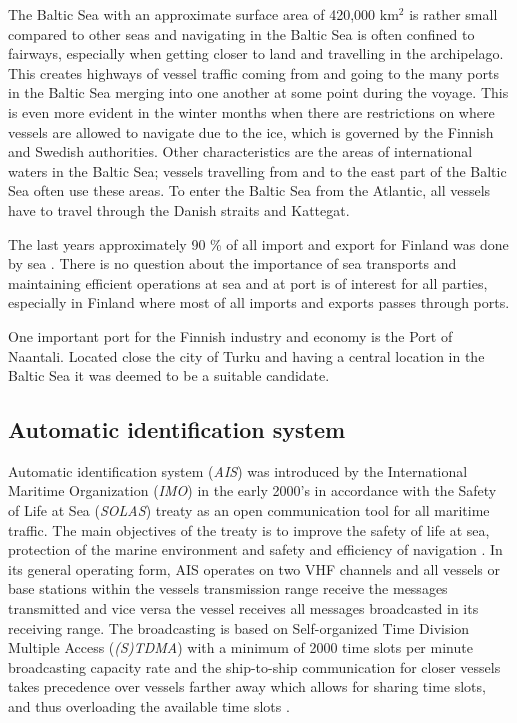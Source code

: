 \documentclass[../main.tex]{subfiles}
\begin{document}
The Baltic Sea with an approximate surface area of 420,000 km$^2$ is rather small compared to other seas and navigating in the Baltic Sea is often confined to fairways, especially when getting closer to land and travelling in the archipelago. This creates highways of vessel traffic coming from and going to the many ports in the Baltic Sea merging into one another at some point during the voyage. This is even more evident in the winter months when there are restrictions on where vessels are allowed to navigate due to the ice, which is governed by the Finnish and Swedish authorities. Other characteristics are the areas of international waters in the Baltic Sea; vessels travelling from and to the east part of the Baltic Sea often use these areas. To enter the Baltic Sea from the Atlantic, all vessels have to travel through the Danish straits and Kattegat.

The last years approximately 90 \% of all import and export for Finland was done by sea \cite{SVRY_2022}. There is no question about the importance of sea transports and maintaining efficient operations at sea and at port is of interest for all parties, especially in Finland where most of all imports and exports passes through ports.

One important port for the Finnish industry and economy is the Port of Naantali. Located close the city of Turku and having a central location in the Baltic Sea it was deemed to be a suitable candidate.

\subsection{Automatic identification system}

Automatic identification system (\textit{AIS}) was introduced by the International Maritime Organization (\textit{IMO}) in the early 2000's in accordance with the Safety of Life at Sea (\textit{SOLAS}) treaty as an open communication tool for all maritime traffic. The main objectives of the treaty is to improve the safety of life at sea, protection of the marine environment and safety and efficiency of navigation \cite{IMO_2015}. In its general operating form, AIS operates on two VHF channels and all vessels or base stations within the vessels transmission range receive the messages transmitted and vice versa the vessel receives all messages broadcasted in its receiving range. The broadcasting is based on Self-organized Time Division Multiple Access (\textit{(S)TDMA}) with a minimum of 2000 time slots per minute broadcasting capacity rate and the ship-to-ship communication for closer vessels takes precedence over vessels farther away which allows for sharing time slots, and thus overloading the available time slots \cite{IMO_2015}.
\end{document}
